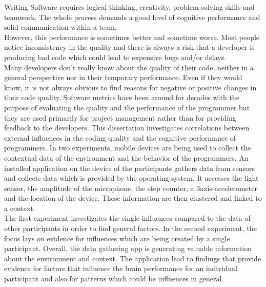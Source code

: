 \documentclass[a4paper, 12pt, oneside]{report}    	%
\begin{document}
\thesistitlepage                                  		%
\thesisdeclarationpage									%
\thesispermissionpage									%

\begin{thesisabstract}
%      
Writing Software requires logical thinking, creativity, problem solving skills and teamwork. The whole process demands a good level of cognitive performance and solid communication within a team.\\
However, this performance is sometimes better and sometime worse. Most people notice inconsistency in the quality and there is always a risk that a developer is producing bad code which could lead to expensive bugs and/or delays.\\
Many developers don't really know about the quality of their code, neither in a general perspective nor in their temporary performance. Even if they would know, it is not always obvious to find reasons for negative or positive changes in their code quality.
Software metrics have been around for decades with the purpose of evaluating the quality and the performance of the programmer but they are used primarily for project management rather than for providing feedback to the developers. 
\bigbreak
This dissertation investigates correlations between external influences in the coding quality and the cognitive performance of programmers. 
In two experiments, mobile devices are being used to collect the contextual data of the environment and the behavior of the programmers. 
An installed application on the device of the participants gathers data from sensors and collects data which is provided by the operating system. It accesses the light sensor, the amplitude of the microphone, the step counter, a 3axis-accelerometer and the location of the device. These information are then clustered and linked to a context.\\
The first experiment investigates the single influences compared to the data of other participants in order to find general factors. In the second experiment, the focus lays on evidence for influences which are being created by a single participant. 
\bigbreak
Overall, the data gathering app is generating valuable information about the environment and context. 
The application lead to findings that provide evidence for factors that influence the brain performance for an individual participant and also for patterns which could be influences in general. 
\end{thesisabstract}
\end{document}
